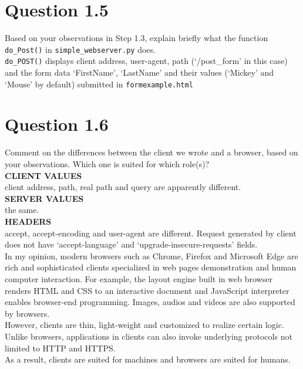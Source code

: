 \documentclass{article}
\newenvironment{homeworkProblem}[1]{
	\section*{#1}
	}{
}
\begin{document}

\begin{homeworkProblem}{Question 1.5}
Based on your observations in Step 1.3, explain briefly what the function \texttt{do\_Post()} in \texttt{simple\_webserver.py} does.\\

\texttt{do\_POST()} displays client address, user-agent, path (`/post\_form' in this case) and the form data `FirstName', `LastName' and their values (`Mickey' and `Mouse' by default) submitted in \texttt{formexample.html}
\end{homeworkProblem}


\begin{homeworkProblem}{Question 1.6}
Comment on the differences between the client we wrote and a browser, based on your observations. Which one is suited for which role(s)?\\

\textbf{CLIENT VALUES}\\
client address, path, real path and query are apparently different.\\

\textbf{SERVER VALUES}\\
the same.\\

\textbf{HEADERS}\\
accept, accept-encoding and user-agent are different. Request generated by client does not have `accept-language' and `upgrade-insecure-requests' fields.\\

In my opinion, modern browsers such as Chrome, Firefox and Microsoft Edge are rich and sophisticated clients specialized in web pages demonstration and human computer interaction. For example, the layout engine built in web browser renders HTML and CSS to an interactive document and JavaScript interpreter enables browser-end programming. Images, audios and videos are also supported by browsers.\\

However, clients are thin, light-weight and customized to realize certain logic. Unlike browsers, applications in clients can also invoke underlying protocols not limited to HTTP and HTTPS.\\

As a result, clients are suited for machines and browsers are suited for humans.
\end{homeworkProblem}
\end{document}
